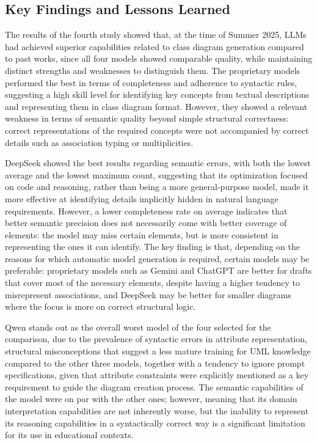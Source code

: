\subsection{Key Findings and Lessons Learned}

The results of the fourth study showed that, at the time of Summer 2025, LLMs had achieved superior capabilities related to class diagram generation compared to past works, since all four models showed comparable quality, while maintaining distinct strengths and weaknesses to distinguish them. The proprietary models performed the best in terms of completeness and adherence to syntactic rules, suggesting a high skill level for identifying key concepts from textual descriptions and representing them in class diagram format. However, they showed a relevant weakness in terms of semantic quality beyond simple structural correctness: correct representations of the required concepts were not accompanied by correct details such as association typing or multiplicities.

DeepSeek showed the best results regarding semantic errors, with both the lowest average and the lowest maximum count, suggesting that its optimization focused on code and reasoning, rather than being a more general-purpose model, made it more effective at identifying details implicitly hidden in natural language requirements. However, a lower completeness rate on average indicates that better semantic precision does not necessarily come with better coverage of elements: the model may miss certain elements, but is more consistent in representing the ones it can identify. The key finding is that, depending on the reasons for which automatic model generation is required, certain models may be preferable: proprietary models such as Gemini and ChatGPT are better for drafts that cover most of the necessary elements, despite having a higher tendency to misrepresent associations, and DeepSeek may be better for smaller diagrams where the focus is more on correct structural logic.

Qwen stands out as the overall worst model of the four selected for the comparison, due to the prevalence of syntactic errors in attribute representation, structural misconceptions that suggest a less mature training for UML knowledge compared to the other three models, together with a tendency to ignore prompt specifications, given that attribute constraints were explicitly mentioned as a key requirement to guide the diagram creation process. The semantic capabilities of the model were on par with the other ones; however, meaning that its domain interpretation capabilities are not inherently worse, but the inability to represent its reasoning capabilities in a syntactically correct way is a significant limitation for its use in educational contexts.

